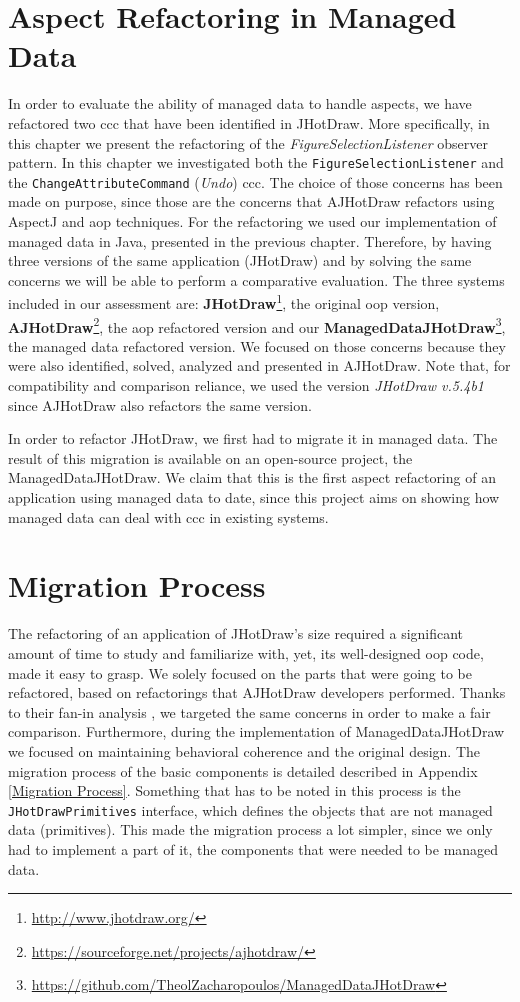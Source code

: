 \section{Aspect Refactoring in Managed Data}
In order to evaluate the ability of managed data to handle aspects, we have refactored two \ac{ccc} that have been identified in JHotDraw.
More specifically, in this chapter we present the refactoring of the \textit{FigureSelectionListener} observer pattern.
In this chapter we investigated both the \texttt{FigureSelectionListener} and the \texttt{ChangeAttributeCommand} (\textit{Undo}) \ac{ccc}.
The choice of those concerns has been made on purpose, since those are the concerns that AJHotDraw refactors using AspectJ and \ac{aop} techniques.
For the refactoring we used our implementation of managed data in Java, presented in the previous chapter.
Therefore, by having three versions of the same application (JHotDraw) and by solving the same concerns we will be able to perform a comparative evaluation.
The three systems included in our assessment are: \textbf{JHotDraw}\footnote{\url{http://www.jhotdraw.org/}}, the original \ac{oop} version, \textbf{AJHotDraw}\footnote{\url{https://sourceforge.net/projects/ajhotdraw/}}, the \ac{aop} refactored version and our \textbf{ManagedDataJHotDraw}\footnote{\url{https://github.com/TheolZacharopoulos/ManagedDataJHotDraw}}, the managed data refactored version.
We focused on those concerns because they were also identified, solved, analyzed and presented in AJHotDraw.
Note that, for compatibility and comparison reliance, we used the version \textit{JHotDraw v.5.4b1} since AJHotDraw also refactors the same version.

In order to refactor JHotDraw, we first had to migrate it in managed data.
The result of this migration is available on an open-source project, the ManagedDataJHotDraw.
We claim that this is the first aspect refactoring of an application using managed data to date, since this project aims on showing how managed data can deal with \ac{ccc} in existing systems.

\section{Migration Process}\label{Migration}
The refactoring of an application of JHotDraw's size required a significant amount of time to study and familiarize with, yet, its well-designed \ac{oop} code, made it easy to grasp.
We solely focused on the parts that were going to be refactored, based on refactorings that AJHotDraw developers \cite{marinajhotdraw} performed.
Thanks to their fan-in analysis \cite{marin2004identifying}, we targeted the same concerns in order to make a fair comparison.
Furthermore, during the implementation of ManagedDataJHotDraw we focused on maintaining behavioral coherence and the original design.
The migration process of the basic components is detailed described in Appendix \ref{Migration Process}.
Something that has to be noted in this process is the \texttt{JHotDrawPrimitives} interface, which defines the objects that are not managed data (primitives).
This made the migration process a lot simpler, since we only had to implement a part of it, the components that were needed to be managed data.

